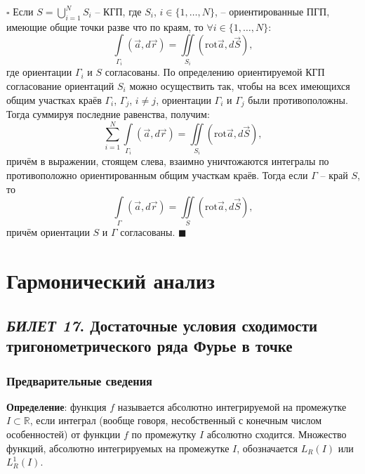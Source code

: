 \documentclass[12pt, a4paper, reqno]{article}
\begin{document}
    $\square$
    Если $S = \bigcup\limits_{i = 1}^{N} S_i$ -- КГП, где $S_i$, $i \in \{1, \ldots, N\}$, -- ориентированные
    ПГП, имеющие общие точки разве что по краям, то $\forall i \in \{1, \ldots, N\}$:
    \begin{equation*}
        \int\limits_{\Gamma_i} (\vec{a}, d\vec{r}) = \iint\limits_{S_i} (\text{rot}\vec{a}, d\vec{S}),
    \end{equation*}
    где ориентации $\Gamma_i$ и $S$ согласованы. По определению ориентируемой КГП согласование ориентаций
    $S_i$ можно осуществить так, чтобы на всех имеющихся общим участках краёв $\Gamma_i$, $\Gamma_j$,
    $i \neq j$, ориентации $\Gamma_i$ и $\Gamma_j$ были противоположны. Тогда суммируя последние
    равенства, получим:
    \begin{equation*}
        \sum\limits_{i = 1}^{N} \int\limits_{\Gamma_i} (\vec{a}, d\vec{r}) =
        \iint\limits_{S_i} (\text{rot}\vec{a}, d\vec{S}),
    \end{equation*}
    причём в выражении, стоящем слева, взаимно уничтожаются интегралы по противоположно ориентированным
    общим участкам краёв. Тогда если $\Gamma$ -- край $S$, то
    \begin{equation*}
        \int\limits_{\Gamma} (\vec{a}, d\vec{r}) = \iint\limits_{S} (\text{rot}\vec{a}, d\vec{S}),
    \end{equation*}
    причём ориентации $S$ и $\Gamma$ согласованы.
    $\blacksquare$

\newpage
\section{Гармонический анализ}

\subsection{\textit{БИЛЕТ 17}. Достаточные условия сходимости тригонометрического ряда Фурье в точке}

    \subsubsection{Предварительные сведения}

    \textbf{Определение}: функция $f$ называется абсолютно интегрируемой на промежутке $I \subset
    \mathbb{R}$, если интеграл (вообще говоря, несобственный с конечным числом особенностей) от
    функции $f$ по промежутку $I$ абсолютно сходится. Множество функций, абсолютно интегрируемых на
    промежутке $I$, обозначается $L_R(I)$ или $L_R^1(I)$.
\end{document}
